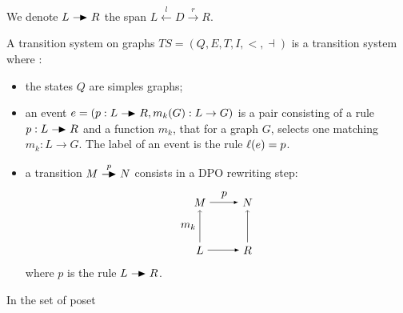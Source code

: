 We denote $L\action R$ the span $L\overset{l}{\leftarrow} D \overset{r}{\rightarrow} R$.

\begin{definition}
  A transition system on graphs $TS = (Q,E,T,I,<,\dashv)$ is a transition system where :
  \begin{itemize}
  \item the states $Q$ are simples graphs;
  \item an event $e=(p:L\action R,m_k(G):L\to G)$ is a pair consisting of a rule $p:L\action R$ and a function $m_k$, that for a graph $G$, selects one matching $m_k :L\to G$. The label of an event is the rule $\ell(e) = p$.
  \item a transition $M\overset{p}{\action} N$ consists in a DPO rewriting step:
    \[
    \begin{tikzpicture} %
      \node (l) at (-1.5,0) {\(L\)};
      \node (r) at (0,0) {\(R\)};
      \node (m) at (-1.5,1.5) {\(M\)};
      \node (n) at (0,1.5) {\(N\)};
      \draw [->] (l) -- node [left,midway] {\(m_k\)}  (m);
      \draw [>=latex, ->] (l) -- (r);
      \draw [>=latex, ->] (m) -- node [above,midway] {\(p\)} (n);
      \draw [->] (r) -- (n);
    \end{tikzpicture}
    \]
    where $p$ is the rule $L\action R$.
  \end{itemize}
\end{definition}



In the set of poset 

